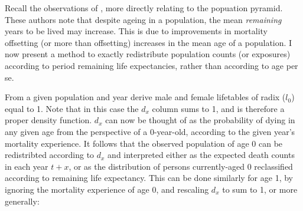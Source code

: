 
Recall the observations of \citet{sanderson2005average}, more directly
relating to the popuation pyramid. These authors note that despite ageing in a
population, the mean \textit{remaining} years to be lived may increase. This is due 
to improvements in mortality offsetting (or more than offsetting) increases in
the mean age of a population. I now present a method to exactly redistribute
population counts (or exposures) according to period remaining life
expectancies, rather than according to age per se.

From a given population and year derive male and female lifetables of radix
($l_0$) equal to 1. Note that in this case the $d_x$ column sums to 1, and is therefore a
proper density function. $d_x$ can now be thought of as the probability of dying 
in any given age from the perspective of a 0-year-old, according to the given year's mortality
experience. It follows that the observed population of age 0 can be redistribted
according to $d_x$ and interpreted either as the expected death counts
in each year $t+x$, or as the distribution of persons currently-aged 0
reclassified according to remaining life expectancy. This can be done similarly
for age 1, by ignoring the mortality experience of age 0, and rescaling $d_x$ to
sum to 1, or more generally:

